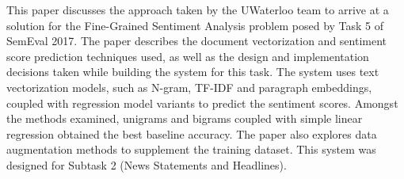 This paper discusses the approach taken by the UWaterloo team to arrive at a solution for the Fine-Grained Sentiment Analysis problem posed by Task 5 of SemEval 2017. The paper describes the document vectorization and sentiment score prediction techniques used, as well as the design and implementation decisions taken while building the system for this task. The system uses text vectorization models, such as N-gram, TF-IDF and paragraph embeddings, coupled with regression model variants to predict the sentiment scores. Amongst the methods examined, unigrams and bigrams coupled with simple linear regression obtained the best baseline accuracy. The paper also explores data augmentation methods to supplement the training dataset. This system was designed for Subtask 2 (News Statements and Headlines).
